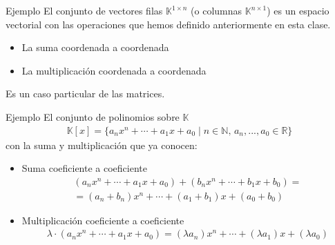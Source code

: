 \documentclass[handout]{beamer} %
\newcommand{\R}{\mathbb R}
\newcommand{\K}{\mathbb K}
\newcommand{\N}{\mathbb N}
\begin{document}
        
        \begin{frame}
        
        \begin{block}{Ejemplo}
        El conjunto de vectores filas $\K^{1\times n}$  (o columnas $\K^{n\times 1}$) es un espacio vectorial con las operaciones que hemos definido anteriormente en esta clase.\pause
        \begin{itemize}
         \item La suma coordenada a coordenada
         \item La multiplicación coordenada a coordenada
        \end{itemize}


        
        \end{block}
        \pause
        \begin{block}{}
        Es un caso particular de las matrices. 
        \end{block}
        
         
        \end{frame}
       
        
        
        \begin{frame}
        
        \begin{block}{Ejemplo}
        El conjunto de polinomios sobre $\K$
        \begin{align*}
        \K[x]=\{a_nx^n+\cdots +a_1 x+a_0\mid n\in\N,\, a_n, ..., a_0\in\R\} 
        \end{align*}
        con la suma y multiplicación que ya conocen:\pause
        \end{block}
        
        \begin{block}{}
        \begin{itemize}
         \item Suma coeficiente a coeficiente
         \begin{multline*}
            (a_nx^n+\cdots +a_1 x+a_0)+(b_nx^n+\cdots +b_1 x+b_0)=\\
            = (a_n+b_n)x^n+\cdots +(a_1+b_1) x+(a_0+b_0)
         \end{multline*}
        
         \pause
        
         \item Multiplicación coeficiente a coeficiente
         \begin{multline*}
         \lambda\cdot (a_nx^n+\cdots +a_1 x+a_0)
         =(\lambda a_n)x^n+\cdots +(\lambda a_1) x+(\lambda a_0)
         \end{multline*}
        \end{itemize}
         
        \end{block}
        
         
        \end{frame}
        
\end{document}
